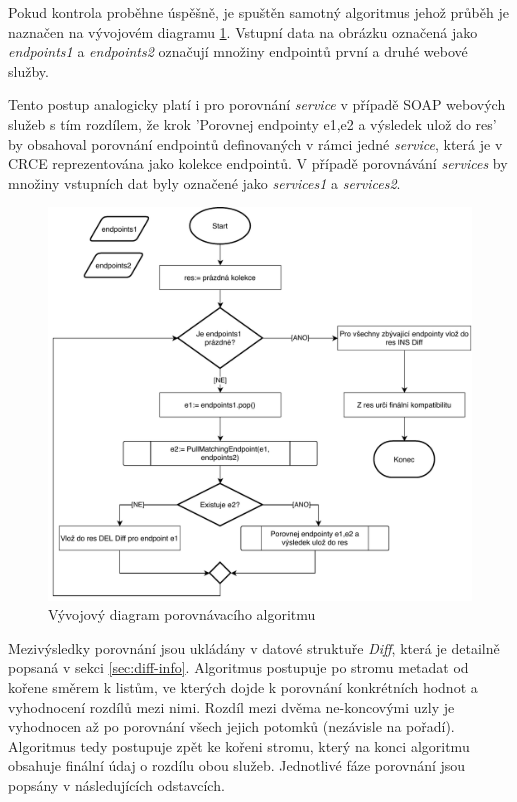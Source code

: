 \documentclass[czech,DP]{thesiskiv}
\begin{document}
Pokud kontrola proběhne úspěšně, je spuštěn samotný algoritmus jehož průběh je naznačen na vývojovém diagramu \ref{fig:apicomp-flow}. Vstupní data na obrázku označená jako \textit{endpoints1} a \textit{endpoints2} označují množiny endpointů první a druhé webové služby. 

Tento postup analogicky platí i pro porovnání \textit{service} v případě SOAP webových služeb s tím rozdílem, že krok 'Porovnej endpointy e1,e2 a výsledek ulož do res' by obsahoval porovnání endpointů definovaných v rámci jedné \textit{service}, která je v CRCE reprezentována jako kolekce endpointů. V případě porovnávání \textit{services} by množiny vstupních dat byly označené jako \textit{services1} a \textit{services2}.

\begin{figure}[h]
	\centering
	\includegraphics[width=\linewidth]{apicomp-flow}
	\caption{Vývojový diagram porovnávacího algoritmu}
	\label{fig:apicomp-flow}
\end{figure}

Mezivýsledky porovnání jsou ukládány v datové struktuře \textit{Diff}, která je detailně popsaná v sekci \ref{sec:diff-info}. Algoritmus postupuje po stromu metadat od kořene směrem k listům, ve kterých dojde k porovnání konkrétních hodnot a vyhodnocení rozdílů mezi nimi. Rozdíl mezi dvěma ne-koncovými uzly je vyhodnocen až po porovnání všech jejich potomků (nezávisle na pořadí). Algoritmus tedy postupuje zpět ke kořeni stromu, který na konci algoritmu obsahuje finální údaj o rozdílu obou služeb. Jednotlivé fáze porovnání jsou popsány v následujících odstavcích.
\end{document}

